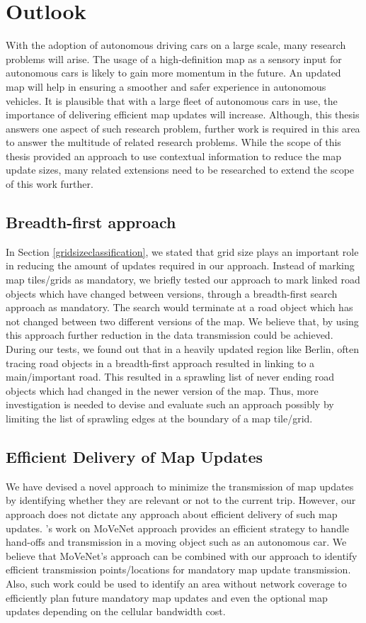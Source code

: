\section{Outlook}
With the adoption of autonomous driving cars on a large scale, many research problems will arise. The usage of a high-definition map as a sensory input for autonomous cars is likely to gain more momentum in the future. An updated map will help in ensuring a smoother and safer experience in autonomous vehicles. It is plausible that with a large fleet of autonomous cars in use, the importance of delivering efficient map updates will increase. Although, this thesis answers one aspect of such research problem, further work is required in this area to answer the multitude of related research problems. While the scope of this thesis provided an approach to use contextual information to reduce the map update sizes, many related extensions need to be researched to extend the scope of this work further. 
\subsection{Breadth-first approach} \label{futurebfs}
In Section \ref{gridsizeclassification}, we stated that grid size plays an important role in reducing the amount of updates required in our approach. Instead of marking map tiles/grids as mandatory, we briefly tested our approach to mark linked road objects which have changed between versions, through a breadth-first search approach as mandatory. The search would terminate at a road object which has not changed between two different versions of the map. We believe that, by using this approach further reduction in the data transmission could be achieved. During our tests, we found out that in a heavily updated region like Berlin, often tracing road objects in a breadth-first approach resulted in linking to a main/important road. This resulted in a sprawling list of never ending road objects which had changed in the newer version of the map. Thus, more investigation is needed to devise and evaluate such an approach possibly by limiting the list of sprawling edges at the boundary of a map tile/grid.
\subsection{Efficient Delivery of Map Updates}
We have devised a novel approach to minimize the transmission of map updates by identifying whether they are relevant or not to the current trip. However, our approach does not dictate any approach about efficient delivery of such map updates. \citet{movenet}'s work on MoVeNet approach provides an efficient strategy to handle hand-offs and transmission in a moving object such as an autonomous car. We believe that MoVeNet's approach can be combined with our approach to identify efficient transmission points/locations for mandatory map update transmission. Also, such work could be used to identify an area without network coverage to efficiently plan future mandatory map updates and even the optional map updates depending on the cellular bandwidth cost.



